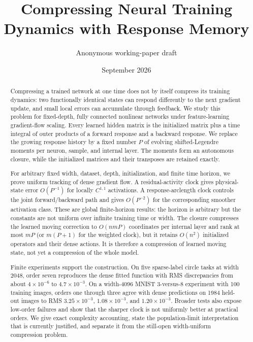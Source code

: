 \documentclass[11pt]{article}
\title{Compressing Neural Training Dynamics with Response Memory}
\author{Anonymous working-paper draft}
\date{September 2026}
\theoremstyle{definition}
\theoremstyle{remark}
\begin{document}
\maketitle

\begin{abstract}
Compressing a trained network at one time does not by itself compress its
training dynamics: two functionally identical states can respond differently
to the next gradient update, and small local errors can accumulate through
feedback.  We study this problem for fixed-depth, fully connected nonlinear
networks under feature-learning gradient-flow scaling.  Every learned hidden
matrix is the initialized matrix plus a time integral of outer products of a
forward response and a backward response.  We replace the growing response
history by a fixed number $P$ of evolving shifted-Legendre moments per neuron,
sample, and internal layer.  The moments form an autonomous closure, while the
initialized matrices and their transposes are retained exactly.

For arbitrary fixed width, dataset, depth, initialization, and finite time
horizon, we prove uniform tracking of dense gradient flow.  A residual-activity
clock gives physical-state error $O(P^{-1})$ for locally $C^{1,1}$ activations.
A response-arclength clock controls the joint forward/backward path and gives
$O(P^{-2})$ for the corresponding smoother activation class.  These are
global finite-horizon results: the horizon is arbitrary but the constants are
not uniform over infinite training time or width.  The closure compresses the
learned moving correction to $O(nmP)$ coordinates per internal layer and rank
at most $mP$ (or $m(P+1)$ for the weighted clock), but it retains $O(n^2)$
initialized operators and their dense actions.  It is therefore a compression
of learned moving state, not yet a compression of the whole model.

Finite experiments support the construction.  On five sparse-label circle
tasks at width 2048, order seven reproduces the dense fitted function with
RMS discrepancies from about $4\times10^{-6}$ to $4.7\times10^{-3}$.  On a
width-4096 MNIST 3-versus-8 experiment with 100 training images, orders one
through three agree with dense predictions on 1984 held-out images to RMS
$3.25\times10^{-3}$, $1.08\times10^{-3}$, and $1.20\times10^{-3}$.  Broader
tests also expose low-order failures and show that the sharper clock is not
uniformly better at practical orders.  We give exact complexity accounting,
state the population-limit interpretation that is currently justified, and
separate it from the still-open width-uniform compression problem.
\end{abstract}









\appendix





\end{document}
